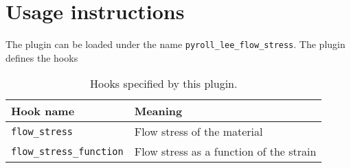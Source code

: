 \documentclass[11pt]{PyRollDocs}
\begin{document}
    \section{Usage instructions}\label{sec:usage-instructions}

    The plugin can be loaded under the name \texttt{pyroll\_lee\_flow\_stress}.
    The plugin defines the hooks

    \begin{table}[h]
        \centering
        \caption{Hooks specified by this plugin.}
        \label{tab:hookspecs}
        \begin{tabular}{ll}
            \toprule
            Hook name                       & Meaning                                 \\
            \midrule
            \texttt{flow\_stress}           & Flow stress of the material             \\
            \texttt{flow\_stress\_function} & Flow stress as a function of the strain \\
            \bottomrule
        \end{tabular}
    \end{table}

    \printbibliography
\end{document}
